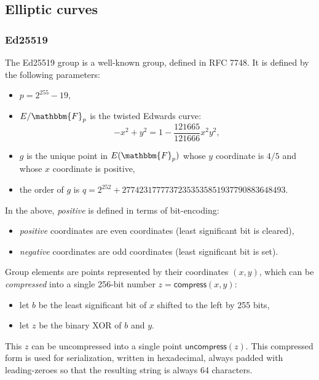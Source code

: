 \documentclass[a4paper]{article}
\newcommand{\F}{\mathbbm{F}}
\begin{document}
\subsection{Elliptic curves}

\subsubsection{Ed25519}

The Ed25519 group is a well-known group, defined in RFC 7748. It is
defined by the following parameters:
\begin{itemize}
\item $p=2^{255}-19$,
\item $E/\F_p$ is the twisted Edwards curve:
  \[
    -x^2+y^2=1-\frac{121665}{121666}x^2y^2,
  \]
\item $g$ is the unique point in $E(\F_p)$ whose $y$ coordinate is
  $4/5$ and whose $x$ coordinate is positive,
\item the order of $g$ is $q=2^{252}+27742317777372353535851937790883648493$.
\end{itemize}
In the above, \emph{positive} is defined in terms of bit-encoding:
\begin{itemize}
\item \emph{positive} coordinates are even coordinates (least significant bit is cleared),
\item \emph{negative} coordinates are odd coordinates (least significant bit is set).
\end{itemize}

Group elements are points represented by their coordinates $(x, y)$,
which can be \emph{compressed} into a single 256-bit number
$z=\textsf{compress}(x,y)$:
\begin{itemize}
\item let $b$ be the least significant bit of $x$ shifted to the left
  by 255 bits,
\item let $z$ be the binary XOR of $b$ and $y$.
\end{itemize}
This $z$ can be uncompressed into a single point
$\textsf{uncompress}(z)$. This compressed form is used for
serialization, written in hexadecimal, always padded with
leading-zeroes so that the resulting string is always 64 characters.
\end{document}
